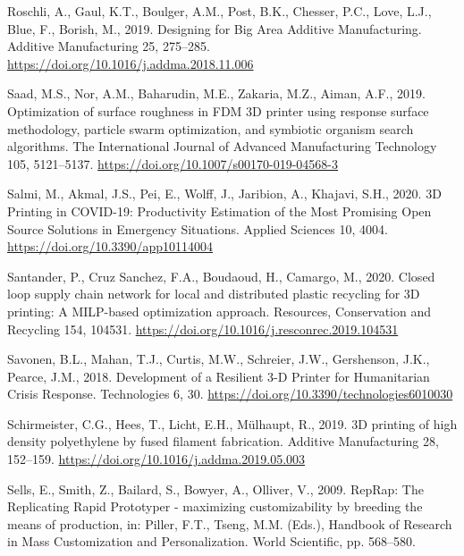 \documentclass[
  12pt,
  number,
  review]{elsarticle}
\newlength{\cslhangindent}
\newlength{\cslentryspacingunit} %
\newenvironment{CSLReferences}[2] %
 {%
  \setlength{\parindent}{0pt}
  \ifodd #1
  \let\oldpar\par
  \def\par{\hangindent=\cslhangindent\oldpar}
  \fi
  \setlength{\parskip}{#2\cslentryspacingunit}
 }%
 {}
\begin{document}
\begin{CSLReferences}{1}{0}
\leavevmode{}%
Roschli, A., Gaul, K.T., Boulger, A.M., Post, B.K., Chesser, P.C., Love,
L.J., Blue, F., Borish, M., 2019. Designing for {Big Area Additive
Manufacturing}. Additive Manufacturing 25, 275--285.
\url{https://doi.org/10.1016/j.addma.2018.11.006}

\leavevmode{}%
Saad, M.S., Nor, A.M., Baharudin, M.E., Zakaria, M.Z., Aiman, A.F.,
2019. Optimization of surface roughness in {FDM 3D} printer using
response surface methodology, particle swarm optimization, and symbiotic
organism search algorithms. The International Journal of Advanced
Manufacturing Technology 105, 5121--5137.
\url{https://doi.org/10.1007/s00170-019-04568-3}

\leavevmode{}%
Salmi, M., Akmal, J.S., Pei, E., Wolff, J., Jaribion, A., Khajavi, S.H.,
2020. {3D Printing} in {COVID-19}: {Productivity Estimation} of the
{Most Promising Open Source Solutions} in {Emergency Situations}.
Applied Sciences 10, 4004. \url{https://doi.org/10.3390/app10114004}

\leavevmode{}%
Santander, P., Cruz Sanchez, F.A., Boudaoud, H., Camargo, M., 2020.
Closed loop supply chain network for local and distributed plastic
recycling for {3D} printing: A {MILP-based} optimization approach.
Resources, Conservation and Recycling 154, 104531.
\url{https://doi.org/10.1016/j.resconrec.2019.104531}

\leavevmode{}%
Savonen, B.L., Mahan, T.J., Curtis, M.W., Schreier, J.W., Gershenson,
J.K., Pearce, J.M., 2018. Development of a {Resilient} 3-{D Printer} for
{Humanitarian Crisis Response}. Technologies 6, 30.
\url{https://doi.org/10.3390/technologies6010030}

\leavevmode{}%
Schirmeister, C.G., Hees, T., Licht, E.H., Mülhaupt, R., 2019. {3D}
printing of high density polyethylene by fused filament fabrication.
Additive Manufacturing 28, 152--159.
\url{https://doi.org/10.1016/j.addma.2019.05.003}

\leavevmode{}%
Sells, E., Smith, Z., Bailard, S., Bowyer, A., Olliver, V., 2009.
{RepRap}: {The Replicating Rapid Prototyper} - maximizing
customizability by breeding the means of production, in: Piller, F.T.,
Tseng, M.M. (Eds.), Handbook of {Research} in {Mass Customization} and
{Personalization}. {World Scientific}, pp. 568--580.


\end{CSLReferences}
\end{document}
